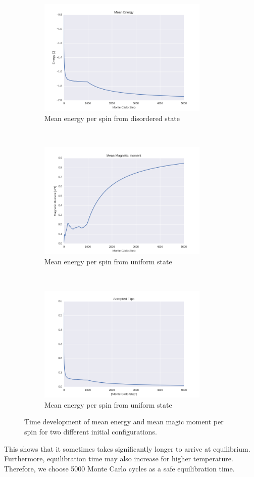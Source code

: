 \documentclass[a4paper, 10pt]{article}
\begin{document}
\begin{figure}[!ht]
    \centering
    \begin{subfigure}[H!]{0.5\textwidth}
        \centering
        \includegraphics[height=2.2in]{meanEnergyLocalMin.png}
        \caption{Mean energy per spin from disordered state}
    \end{subfigure}%
    ~ 
    \begin{subfigure}[H!]{0.5\textwidth}
        \centering
        \includegraphics[height=2.2in]{meanMagMomLocalMin.png}
        \caption{Mean energy per spin from uniform state}
    \end{subfigure}
     ~ 
    \begin{subfigure}[H!]{0.5\textwidth}
        \centering
        \includegraphics[height=2.2in]{flipsLocalMin.png}
        \caption{Mean energy per spin from uniform state}
    \end{subfigure}
       \caption{Time development of mean energy and mean magic moment per spin for two different initial configurations.}\label{fig:20x20_Sweep_flips}
\end{figure}
This shows that it sometimes takes significantly longer to arrive at equilibrium. Furthermore, equilibration time may also increase for higher temperature. Therefore, we choose 5000 Monte Carlo cycles as a safe equilibration time.
\end{document}
